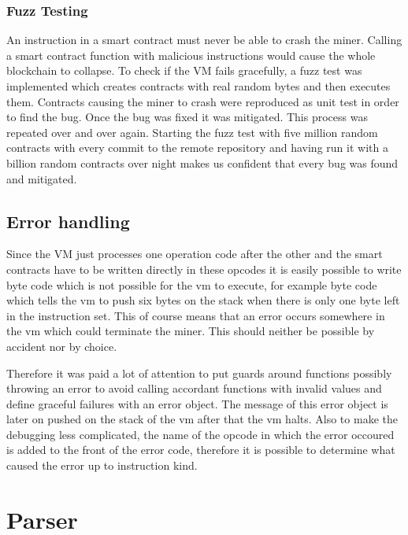 \subsubsection{Fuzz Testing}
An instruction in a smart contract must never be able to crash the miner. Calling a smart contract function with malicious instructions would cause the whole blockchain to collapse. To check if the VM fails gracefully, a fuzz test was implemented which creates contracts with real random bytes and then executes them. Contracts causing the miner to crash were reproduced as unit test in order to find the bug. Once the bug was fixed it was mitigated. This process was repeated over and over again. Starting the fuzz test with five million random contracts with every commit to the remote repository and having run it with a billion random contracts over night makes us confident that every bug was found and mitigated.

\subsection{Error handling}
Since the VM just processes one operation code after the other and the smart contracts have to be written directly in these opcodes it is easily possible to write byte code which is not possible for the vm to execute, for example byte code which tells the vm to push six bytes on the stack when there is only one byte left in the instruction set. This of course means that an error occurs somewhere in the vm which could terminate the miner. This should neither be possible by accident nor by choice.

Therefore it was paid a lot of attention to put guards around functions possibly throwing an error to avoid calling accordant functions with invalid values and define graceful failures with an error object. The message of this error object is later on pushed on the stack of the vm after that the vm halts. Also to make the debugging less complicated, the name of the opcode in which the error occoured is added to the front of the error code, therefore it is possible to determine what caused the error up to instruction kind.


\section{Parser}
